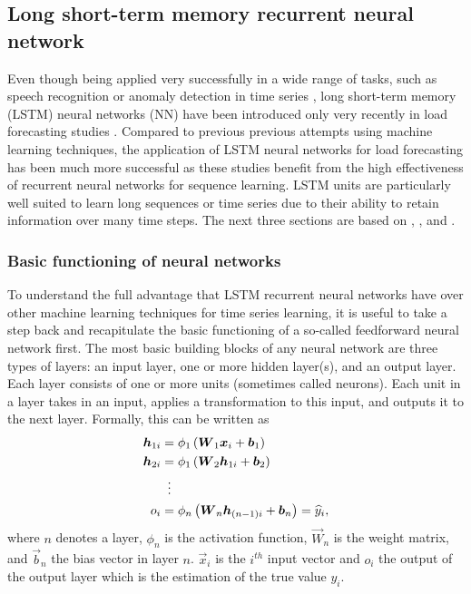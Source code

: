 
\subsection{Long short-term memory recurrent neural network} \label{Sec:Method;Subsec:LSTM}

Even though being applied very successfully in a wide range of tasks, such as speech recognition \citep{Graves:2013} or anomaly detection in time series \citep{Malhotra:2015}, long short-term memory (LSTM) neural networks (NN) have been introduced only very recently in load forecasting studies \citep[e.g.,][]{Kong:2018,Shi:2017,Gan:2017,Chen:2018}. Compared to previous previous attempts using machine learning techniques, the application of LSTM neural networks for load forecasting has been much more successful \citep{Kong:2018,Shi:2017} as these studies benefit from the high effectiveness of recurrent neural networks for sequence learning. LSTM units are particularly well suited to learn long sequences or time series due to their ability to retain information over many time steps. The next three sections are based on \citet{chollet:2018}, \citet{Lipton:2015}, and \citet{Gan:2017}.



\subsubsection{Basic functioning of neural networks}

To understand the full advantage that LSTM recurrent neural networks have over other machine learning techniques for time series learning, it is useful to take a step back and recapitulate the basic functioning of a so-called feedforward neural network first. The most basic building blocks of any neural network are three types of layers: an input layer, one or more hidden layer(s), and an output layer. Each layer consists of one or more units (sometimes called neurons). Each unit in a layer takes in an input, applies a transformation to this input, and outputs it to the next layer. Formally, this can be written as
%
\begin{equation} \label{feedforward}
\begin{split}
    \vec{h}_{1i}&=\phi_1\left(\vec{W}_1\vec{x}_i+\vec{b}_1\right)\\
    \vec{h}_{2i}&=\phi_1\left(\vec{W}_2\vec{h}_{1i}+\vec{b}_2\right)\\
    &\setbox0\hbox{=}\mathrel{\makebox[\wd0]{\hfil\vdots\hfil}}\\
    o_i&=\phi_n\left(\vec{W}_n\vec{h}_{(n-1)i}+\vec{b}_n\right)=\widehat{y}_i,
\end{split}
\end{equation}
%
where $n$ denotes a layer, $\phi_n$ is the activation function, $\vec{W}_n$ is the weight matrix, and $\vec{b}_n$ the bias vector in layer $n$. $\vec{x}_i$ is the $i^{th}$ input vector and $o_i$ the output of the output layer which is the estimation of the true value $y_i$.


